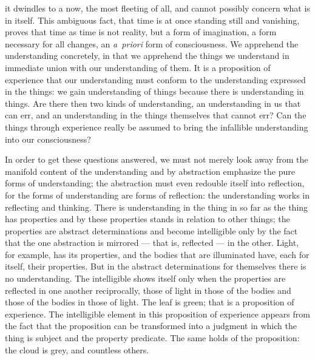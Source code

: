 \documentclass[12pt]{book}
\begin{document}
it dwindles to a now, the most fleeting of all, and cannot possibly concern
what is in itself. This ambiguous fact, that time is at once standing still and
vanishing, proves that time as time is not reality, but a form of imagination,
a form necessary for all changes, an \textit{a~priori} form of consciousness.
We apprehend the understanding concretely, in that we apprehend the things we
understand in immediate union with our understanding of them. It is a
proposition of experience that our understanding must conform to the
understanding expressed in the things: we gain understanding of things because
there is understanding in things. Are there then two kinds of understanding,
an understanding in us that can err, and an understanding in the things
themselves that cannot err? Can the things through experience really be
assumed to bring the infallible understanding into our consciousness?

In order to get these questions answered, we must not merely look away from
the manifold content of the understanding and by abstraction emphasize the
pure forms of understanding; the abstraction must even redouble itself into
reflection, for the forms of understanding are forms of reflection: the
understanding works in reflecting and thinking. There is understanding in the
thing in so far as the thing has properties and by these properties stands in
relation to other things; the properties are abstract determinations and
become intelligible only by the fact that the one abstraction is mirrored ---
that is, reflected --- in the other. Light, for example, has its properties,
and the bodies that are illuminated have, each for itself, their properties.
But in the abstract determinations for themselves there is no understanding.
The intelligible shows itself only when the properties are reflected in one
another reciprocally, those of light in those of the bodies and those of the
bodies in those of light. The leaf is green; that is a proposition of
experience. The intelligible element in this proposition of experience appears
from the fact that the proposition can be transformed into a judgment in which
the thing is subject and the property predicate. The same holds of the
proposition: the cloud is grey, and countless others.
\end{document}
